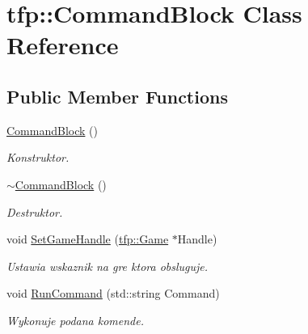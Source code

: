 \hypertarget{classtfp_1_1_command_block}{}\section{tfp\+:\+:Command\+Block Class Reference}
\label{classtfp_1_1_command_block}
\subsection*{Public Member Functions}
\begin{DoxyCompactItemize}
\item 
\mbox{\label{classtfp_1_1_command_block_a153df72580c2a88ff78c8bbf54e3930a}} 
\mbox{\hyperlink{classtfp_1_1_command_block_a153df72580c2a88ff78c8bbf54e3930a}{Command\+Block}} ()
\begin{DoxyCompactList}\small\item\em Konstruktor. \end{DoxyCompactList}\item 
\mbox{\label{classtfp_1_1_command_block_a6236bd155b13d4233688958377ca82fe}} 
\mbox{\hyperlink{classtfp_1_1_command_block_a6236bd155b13d4233688958377ca82fe}{$\sim$\+Command\+Block}} ()
\begin{DoxyCompactList}\small\item\em Destruktor. \end{DoxyCompactList}\item 
\mbox{\label{classtfp_1_1_command_block_af4459526fcd977acf5f7b0805042a6ad}} 
void \mbox{\hyperlink{classtfp_1_1_command_block_af4459526fcd977acf5f7b0805042a6ad}{Set\+Game\+Handle}} (\mbox{\hyperlink{classtfp_1_1_game}{tfp\+::\+Game}} $\ast$Handle)
\begin{DoxyCompactList}\small\item\em Ustawia wskaznik na gre ktora obsluguje. \end{DoxyCompactList}\item 
void \mbox{\hyperlink{classtfp_1_1_command_block_ab87816104ea217209676d5e6788921a1}{Run\+Command}} (std\+::string Command)
\begin{DoxyCompactList}\small\item\em Wykonuje podana komende. \end{DoxyCompactList}\item 

\end{DoxyCompactItemize}
